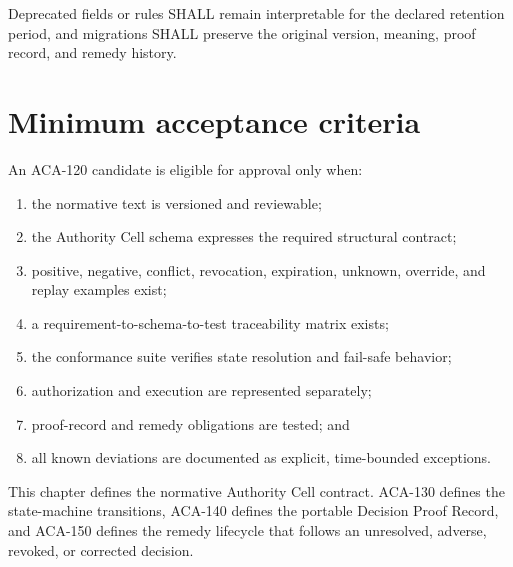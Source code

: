 \begin{requirement}[ACA-120-055]
Deprecated fields or rules SHALL remain interpretable for the declared retention
period, and migrations SHALL preserve the original version, meaning, proof
record, and remedy history.
\end{requirement}

\section{Minimum acceptance criteria}
An ACA-120 candidate is eligible for approval only when:
\begin{enumerate}
\item the normative text is versioned and reviewable;
\item the Authority Cell schema expresses the required structural contract;
\item positive, negative, conflict, revocation, expiration, unknown, override,
and replay examples exist;
\item a requirement-to-schema-to-test traceability matrix exists;
\item the conformance suite verifies state resolution and fail-safe behavior;
\item authorization and execution are represented separately;
\item proof-record and remedy obligations are tested; and
\item all known deviations are documented as explicit, time-bounded exceptions.
\end{enumerate}

This chapter defines the normative Authority Cell contract. ACA-130 defines the
state-machine transitions, ACA-140 defines the portable Decision Proof Record,
and ACA-150 defines the remedy lifecycle that follows an unresolved, adverse,
revoked, or corrected decision.